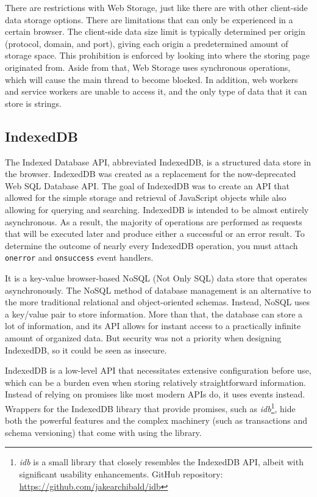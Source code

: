 There are restrictions with Web Storage, just like there are with other client-side data storage options. There are limitations that can only be experienced in a certain browser. The client-side data size limit is typically determined per origin (protocol, domain, and port), giving each origin a predetermined amount of storage space. This prohibition is enforced by looking into where the storing page originated from. Aside from that, Web Storage uses synchronous operations, which will cause the main thread to become blocked. In addition, web workers and service workers are unable to access it, and the only type of data that it can store is strings.

\subsection*{IndexedDB}
The Indexed Database API, abbreviated IndexedDB, is a structured data store in the browser. IndexedDB was created as a replacement for the now-deprecated Web SQL Database API. The goal of IndexedDB was to create an API that allowed for the simple storage and retrieval of JavaScript objects while also allowing for querying and searching. IndexedDB is intended to be almost entirely asynchronous. As a result, the majority of operations are performed as requests that will be executed later and produce either a successful or an error result. To determine the outcome of nearly every IndexedDB operation, you must attach \texttt{onerror} and \texttt{onsuccess} event handlers.

It is a key-value browser-based NoSQL (Not Only SQL) data store that operates asynchronously. The NoSQL method of database management is an alternative to the more traditional relational and object-oriented schemas. Instead, NoSQL uses a key/value pair to store information. More than that, the database can store a lot of information, and its API allows for instant access to a practically infinite amount of organized data. But security was not a priority when designing IndexedDB, so it could be seen as insecure.

IndexedDB is a low-level API that necessitates extensive configuration before use, which can be a burden even when storing relatively straightforward information. Instead of relying on promises like most modern APIs do, it uses events instead. Wrappers for the IndexedDB library that provide promises, such as \emph{idb}\footnote{\emph{idb} is a small library that closely resembles the IndexedDB API, albeit with significant usability enhancements. GitHub repository: \url{https://github.com/jakearchibald/idb}}, hide both the powerful features and the complex machinery (such as transactions and schema versioning) that come with using the library.

